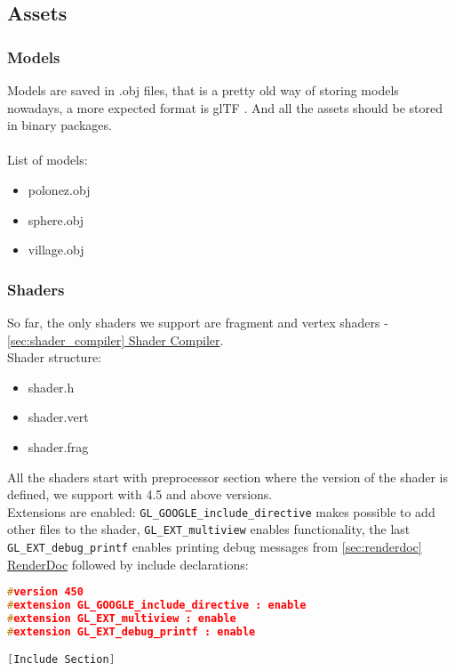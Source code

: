 \newpage
\subsection{Assets}
\label{sec:assets}
\subsubsection{Models}
\hspace{\parindent} Models are saved in .obj files, that is a pretty old way of storing models nowadays, a more expected format is glTF \cite{gltf}. And all the assets should be stored in binary packages.\\\\
List of models:
\begin{itemize}
    \item polonez.obj \cite{PolonezModel}
    \item sphere.obj
    \item village.obj \cite{VillageModel}
\end{itemize}
\subsubsection{Shaders}
\hspace{\parindent} So far, the only shaders we support are fragment and vertex shaders - \hyperref[sec:shader_compiler]{\ref*{sec:shader_compiler} Shader Compiler}.\\
Shader structure:
\begin{itemize}
    \item shader.h
    \item shader.vert
    \item shader.frag
\end{itemize}

All the shaders start with preprocessor section where the version of the shader is defined, we support with 4.5 and above versions.\\
Extensions are enabled: \texttt{GL\_GOOGLE\_include\_directive} makes possible to add other files to the shader, \texttt{GL\_EXT\_multiview} enables \cite{multiview} functionality, the last \texttt{GL\_EXT\_debug\_printf} enables printing debug messages from \hyperref[sec:renderdoc]{\ref*{sec:renderdoc} RenderDoc} followed by include declarations:
\begin{lstlisting}[language=c++, caption=Common a shader preprocessor]
#version 450
#extension GL_GOOGLE_include_directive : enable
#extension GL_EXT_multiview : enable
#extension GL_EXT_debug_printf : enable

[Include Section]
\end{lstlisting}

